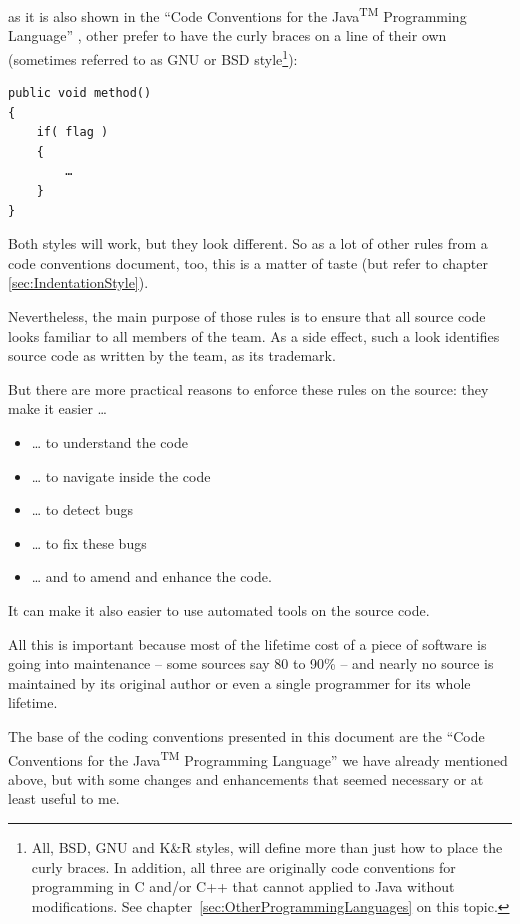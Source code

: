 \documentclass[12pt,a4paper,titlepage, parskip=half, headsepline, footsepline, cleardoubleplain]{scrbook}
\begin{document}
as it is also shown in the “Code Conventions for the Java\textsuperscript{TM} Programming Language” \autocite{SUN_CODE_CONVENTIONS}, other prefer to have the curly braces on a line of their own (sometimes referred to as GNU or BSD style\footnote{All, BSD, GNU and K\&R styles, will define more than just how to place the curly braces. In addition, all three are originally code conventions for programming in C and/or C++ that cannot applied to Java without modifications. See chapter~\ref{sec:OtherProgrammingLanguages} on this topic.}):

\begin{lstlisting}
public void method()
{
    if( flag )
    {
    	…
    }
}
\end{lstlisting}

Both styles will work, but they look different. So as a lot of other rules from a code conventions document, too, this is a matter of taste (but refer to chapter \vref{sec:IndentationStyle}).

Nevertheless, the main purpose of those rules is to ensure that all source code looks familiar to all members of the team. As a side effect, such a look identifies source code as written by the team, as its trademark.

But there are more practical reasons to enforce these rules on the source: they make it easier …
\begin{itemize}[nosep]
\item … to understand the code
\item … to navigate inside the code
\item … to detect bugs
\item … to fix these bugs
\item … and to amend and enhance the code.
\end{itemize}

It can make it also easier to use automated tools on the source code.

All this is important because most of the lifetime cost of a piece of software is going into maintenance – some sources say 80 to 90\% – and nearly no source is maintained by its original author or even a single programmer for its whole lifetime.

The base of the coding conventions presented in this document are the “Code Conventions for the Java\textsuperscript{TM} Programming Language” \autocite{SUN_CODE_CONVENTIONS} we have already mentioned above, but with some changes and enhancements that seemed necessary or at least useful to me.
\end{document}
